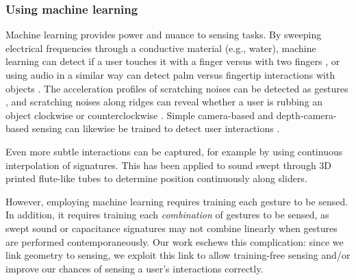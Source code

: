     \subsubsection{Using machine learning}
        Machine learning provides power and nuance to sensing tasks. By sweeping electrical frequencies through a conductive material (e.g., water), machine learning can detect if a user touches it with a finger versus with two fingers \cite{sato-touche}, or using audio in a similar way can detect palm versus fingertip interactions with objects \cite{ono-touchandactivate}. The acceleration profiles of scratching noises can be detected as gestures \cite{harrison-scratchinput}, and scratching noises along ridges can reveal whether a user is rubbing an object clockwise or counterclockwise \cite{murray-smith-stane}. Simple camera-based and depth-camera-based sensing can likewise be trained to detect user interactions  \cite{fails-crayons,holman-sketchspace,klemmer-papiermache,macintyre-DART}.

        Even more subtle interactions can be captured, for example by using continuous interpolation of signatures. This has been applied to sound swept through 3D printed flute-like tubes \cite{laput-acoustruments} to determine position continuously along sliders.

        However, employing machine learning requires training each gesture to be sensed. In addition, it requires training each \emph{combination} of gestures to be sensed, as swept sound or capacitance signatures may not combine linearly when gestures are performed contemporaneously. Our work eschews this complication: since we link geometry to sensing, we exploit this link to allow training-free sensing and/or improve our chances of sensing a user's interactions correctly.


